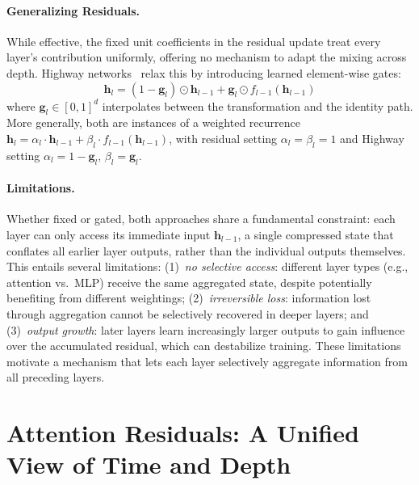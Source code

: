 \paragraph{Generalizing Residuals.}
While effective, the fixed unit coefficients in the residual update treat every layer's contribution uniformly, offering no mechanism to adapt the mixing across depth.
Highway networks~\citep{srivastava2015highway} relax this by introducing learned element-wise gates:
$$\bm{h}_{l} = (1 - \bm{g}_{l}) \odot \bm{h}_{l-1} + \bm{g}_{l} \odot f_{l-1}(\bm{h}_{l-1})$$
where $\bm{g}_l \in [0,1]^d$ interpolates between the transformation and the identity path.
More generally, both are instances of a weighted recurrence $\bm{h}_{l} = \alpha_{l} \cdot \bm{h}_{l-1} + \beta_{l} \cdot f_{l-1}(\bm{h}_{l-1})$, with residual setting $\alpha_{l} {=} \beta_{l} {=} 1$ and Highway setting $\alpha_{l} {=} 1 {-} \bm{g}_{l},\, \beta_{l} {=} \bm{g}_{l}$.

\paragraph{Limitations.}
Whether fixed or gated, both approaches share a fundamental constraint: each layer can only access its immediate input $\bm{h}_{l-1}$, a single compressed state that conflates all earlier layer outputs, rather than the individual outputs themselves.
This entails several limitations:
(1)~\emph{no selective access}: different layer types (e.g., attention vs.\ MLP) receive the same aggregated state, despite potentially benefiting from different weightings;
(2)~\emph{irreversible loss}: information lost through aggregation cannot be selectively recovered in deeper layers;
and (3)~\emph{output growth}: later layers learn increasingly larger outputs to gain influence over the accumulated residual, which can destabilize training.
These limitations motivate a mechanism that lets each layer selectively aggregate information from all preceding layers.











\section{Attention Residuals: A Unified View of Time and Depth}
\label{sec:attnres}

